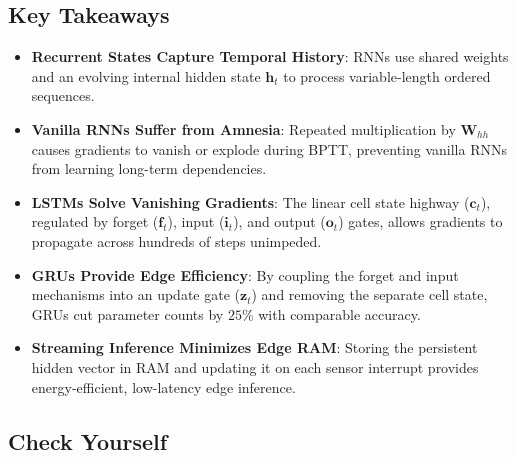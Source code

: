 \subsection{Key Takeaways}\label{subsec:takeaways}

\begin{takeaways}
\begin{itemize}
    \item \textbf{Recurrent States Capture Temporal History}: RNNs use shared weights and an evolving internal hidden state $\mathbf{h}_t$ to process variable-length ordered sequences.
    \item \textbf{Vanilla RNNs Suffer from Amnesia}: Repeated multiplication by $\mathbf{W}_{hh}$ causes gradients to vanish or explode during BPTT, preventing vanilla RNNs from learning long-term dependencies.
    \item \textbf{LSTMs Solve Vanishing Gradients}: The linear cell state highway ($\mathbf{c}_t$), regulated by forget ($\mathbf{f}_t$), input ($\mathbf{i}_t$), and output ($\mathbf{o}_t$) gates, allows gradients to propagate across hundreds of steps unimpeded.
    \item \textbf{GRUs Provide Edge Efficiency}: By coupling the forget and input mechanisms into an update gate ($\mathbf{z}_t$) and removing the separate cell state, GRUs cut parameter counts by $25\%$ with comparable accuracy.
    \item \textbf{Streaming Inference Minimizes Edge RAM}: Storing the persistent hidden vector in RAM and updating it on each sensor interrupt provides energy-efficient, low-latency edge inference.
\end{itemize}
\end{takeaways}

\subsection{Check Yourself}\label{subsec:check_yourself}

